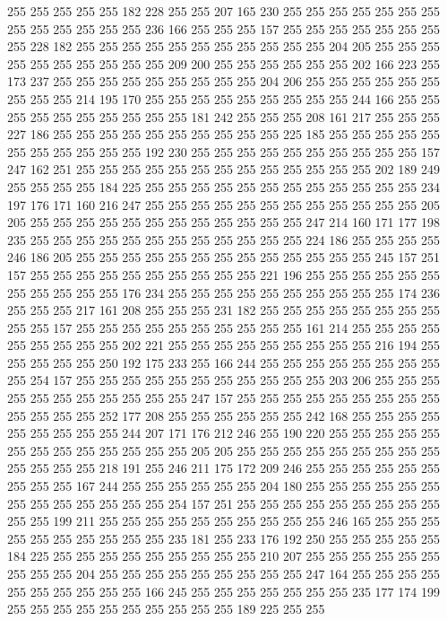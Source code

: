 255 255 255 255 255 182 228 255 255 207 165 230 255 255 255 255 255 255 255 255
255 255 255 255 255 236 166 255 255 255 157 255 255 255 255 255 255 255 255 228
182 255 255 255 255 255 255 255 255 255 255 255 204 205 255 255 255 255 255 255
255 255 255 255 209 200 255 255 255 255 255 255 202 166 223 255 173 237 255 255
255 255 255 255 255 255 255 204 206 255 255 255 255 255 255 255 255 255 214 195
170 255 255 255 255 255 255 255 255 255 244 166 255 255 255 255 255 255 255 255
255 255 181 242 255 255 255 208 161 217 255 255 255 227 186 255 255 255 255 255
255 255 255 255 255 225 185 255 255 255 255 255 255 255 255 255 255 255 192 230
255 255 255 255 255 255 255 255 255 255 157 247 162 251 255 255 255 255 255 255
255 255 255 255 255 255 255 202 189 249 255 255 255 255 184 225 255 255 255 255
255 255 255 255 255 255 255 255 234 197 176 171 160 216 247 255 255 255 255 255
255 255 255 255 255 255 255 205 205 255 255 255 255 255 255 255 255 255 255 255
255 247 214 160 171 177 198 235 255 255 255 255 255 255 255 255 255 255 255 255
224 186 255 255 255 255 246 186 205 255 255 255 255 255 255 255 255 255 255 255
255 255 245 157 251 157 255 255 255 255 255 255 255 255 255 255 221 196 255 255
255 255 255 255 255 255 255 255 255 176 234 255 255 255 255 255 255 255 255 255
255 174 236 255 255 255 217 161 208 255 255 255 231 182 255 255 255 255 255 255
255 255 255 255 157 255 255 255 255 255 255 255 255 255 255 161 214 255 255 255
255 255 255 255 255 255 202 221 255 255 255 255 255 255 255 255 255 216 194 255
255 255 255 255 250 192 175 233 255 166 244 255 255 255 255 255 255 255 255 255
254 157 255 255 255 255 255 255 255 255 255 255 255 203 206 255 255 255 255 255
255 255 255 255 255 255 247 157 255 255 255 255 255 255 255 255 255 255 255 255
255 252 177 208 255 255 255 255 255 255 242 168 255 255 255 255 255 255 255 255
255 244 207 171 176 212 246 255 190 220 255 255 255 255 255 255 255 255 255 255
255 255 255 205 205 255 255 255 255 255 255 255 255 255 255 255 255 255 218 191
255 246 211 175 172 209 246 255 255 255 255 255 255 255 255 255 167 244 255 255
255 255 255 255 204 180 255 255 255 255 255 255 255 255 255 255 255 255 255 254
157 251 255 255 255 255 255 255 255 255 255 255 255 199 211 255 255 255 255 255
255 255 255 255 255 246 165 255 255 255 255 255 255 255 255 255 255 235 181 255
233 176 192 250 255 255 255 255 255 184 225 255 255 255 255 255 255 255 255 255
210 207 255 255 255 255 255 255 255 255 255 204 255 255 255 255 255 255 255 255
255 247 164 255 255 255 255 255 255 255 255 255 255 166 245 255 255 255 255 255
255 255 235 177 174 199 255 255 255 255 255 255 255 255 255 255 189 225 255 255
